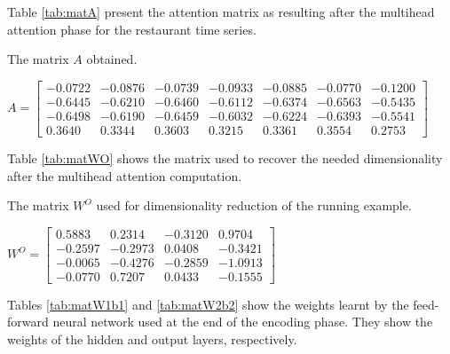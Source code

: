 \documentclass[algorithms,article,submit,pdftex,moreauthors]{Definitions/mdpi}
\begin{document}
\noindent Table \ref{tab:matA} present the attention matrix as resulting after the multihead attention phase for the restaurant time series.

\begin{table}[ht]
	\centering
	\caption{The matrix $A$ obtained.}
	\label{tab:matA}
	$
	A = \begin{bmatrix}
		-0.0722 & -0.0876 & -0.0739 & -0.0933 & -0.0885 & -0.0770 & -0.1200 \\
		-0.6445 & -0.6210 & -0.6460 & -0.6112 & -0.6374 & -0.6563 & -0.5435 \\
		-0.6498 & -0.6190 & -0.6459 & -0.6032 & -0.6224 & -0.6393 & -0.5541 \\
		0.3640 &  0.3344 &  0.3603 &  0.3215 &  0.3361 &  0.3554 &  0.2753
	\end{bmatrix}
	$
\end{table}

\noindent  Table \ref{tab:matWO} shows the matrix used to recover the needed dimensionality after the multihead attention computation.

\begin{table}[ht]
	\centering
	\caption{The matrix $W^O$ used for dimensionality reduction of the running example.}
	\label{tab:matWO}
	$
	W^O =   \begin{bmatrix}
				0.5883 &  0.2314 & -0.3120 &  0.9704 \\
				-0.2597 & -0.2973 &  0.0408 & -0.3421 \\
				-0.0065 & -0.4276 & -0.2859 & -1.0913 \\
				-0.0770 &  0.7207 &  0.0433 & -0.1555
			\end{bmatrix}
	$
\end{table}

\noindent Tables \ref{tab:matW1b1} and \ref{tab:matW2b2} show the weights learnt by the feed-forward neural network used at the end of the encoding phase. They show the weights of the hidden and output layers, respectively.
\end{document}
